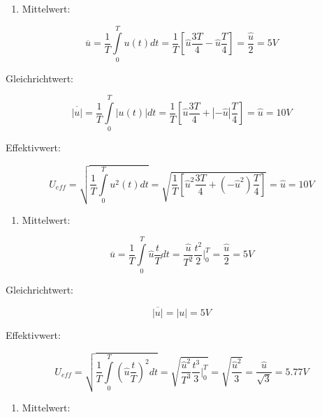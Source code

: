 \documentclass[
  ngerman,
  letterpaper,
]{scrbook}
\providecommand{\tightlist}{%
  \setlength{\itemsep}{0pt}\setlength{\parskip}{0pt}}
\begin{document}
\begin{tcolorbox}[enhanced jigsaw, titlerule=0mm, rightrule=.15mm, toprule=.15mm, colback=white, toptitle=1mm, bottomrule=.15mm, coltitle=black, leftrule=.75mm, arc=.35mm, colbacktitle=quarto-callout-caution-color!10!white, opacityback=0, bottomtitle=1mm, colframe=quarto-callout-caution-color-frame, opacitybacktitle=0.6, breakable, title=\textcolor{quarto-callout-caution-color}{\faFire}\hspace{0.5em}{Lösung 3.3}, left=2mm]

\begin{enumerate}
\def\labelenumi{\alph{enumi})}
\tightlist
\item
  Mittelwert:
\end{enumerate}

\[
\overline{u} = \frac{1}{T} \int\limits_{0}^{T} u(t)dt = \frac{1}{T} \left[ \hat{u} \frac{3T}{4} - \hat{u} \frac{T}{4}
\right] = \frac{\hat{u}}{2} = 5 V
\]

Gleichrichtwert:

\[
\overline{|u|} = \frac{1}{T} \int\limits_{0}^{T} |u(t)|dt = \frac{1}{T} \left[ \hat{u} \frac{3T}{4} + |-\hat{u}|
\frac{T}{4} \right] = \hat{u} = 10 V
\]

Effektivwert:

\[
U_{eff} = \sqrt{\frac{1}{T} \int\limits_{0}^{T} u^2(t)dt} = \sqrt{\frac{1}{T} \left[ \hat{u}^2 \frac{3T}{4} +
(-\hat{u}^2) \frac{T}{4} \right]} = \hat{u} = 10 V
\]

\begin{enumerate}
\def\labelenumi{\alph{enumi})}
\setcounter{enumi}{1}
\tightlist
\item
  Mittelwert:
\end{enumerate}

\[
\overline{u} = \frac{1}{T} \int\limits_{0}^{T} \hat{u} \frac{t}{T} dt = \frac{\hat{u}}{T^2} \frac{t^2}{2} \Big\vert_0^T
= \frac{\hat{u}}{2} = 5 V
\]

Gleichrichtwert:

\[
\overline{|u|} = |u| = 5 V
\]

Effektivwert:

\[
U_{eff} = \sqrt{\frac{1}{T} \int\limits_{0}^{T} \left(\hat{u} \frac{t}{T} \right)^2 dt} 
= \sqrt{\frac{\hat{u}^2}{T^3} \frac{t^3}{3} \Big\vert_0^T} = \sqrt{\frac{\hat{u}^2}{3}} 
= \frac{\hat{u}}{\sqrt{3}} = 5.77 V
\]

\begin{enumerate}
\def\labelenumi{\alph{enumi})}
\setcounter{enumi}{2}
\tightlist
\item
  Mittelwert:
\end{enumerate}


\end{tcolorbox}
\end{document}

